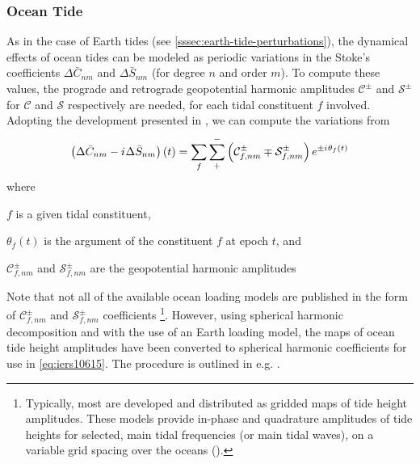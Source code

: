 \subsubsection{Ocean Tide}\label{sssec:ocean-tide-perturbations}

As in the case of Earth tides (see \autoref{sssec:earth-tide-perturbations}), the 
dynamical effects of ocean tides can be modeled as periodic variations in the 
Stoke's coefficients $\Delta \bar{C}_{nm}$ and $\Delta \bar{S}_{nm}$ (for 
degree $n$ and order $m$). To compute these values, the prograde and retrograde 
geopotential harmonic amplitudes $\mathcal{C}^{\pm}$ and $\mathcal{S}^{\pm}$ for 
$\mathcal{C}$ and $\mathcal{S}$ respectively are needed, for each tidal constituent 
$f$ involved. Adopting the development presented in \cite{iers2010}, we can compute 
the variations from
\begin{equation}
  \label{eq:iers10615}
  \left( \Delta \bar{C}_{nm} - {i\mkern1mu} \Delta \bar{S}_{nm} \right) (t) =
    \sum_{f} \sum_{+}^{-} \left( 
      \mathcal{C}_{f,nm}^{\pm} \mp \mathcal{S}_{f,nm}^{\pm} \right)
    e^{\pm {i\mkern1mu} \theta _f (t)}
\end{equation}
where
\begin{description}
  \item $f$ is a given tidal constituent,
  \item $\theta _f (t)$ is the argument of the constituent $f$ at epoch $t$, and
  \item $\mathcal{C}_{f,nm}^{\pm}$ and $\mathcal{S}_{f,nm}^{\pm}$ are the geopotential 
    harmonic amplitudes
\end{description}

Note that not all of the available ocean loading models are published in the form of 
$\mathcal{C}_{f,nm}^{\pm}$ and $\mathcal{S}_{f,nm}^{\pm}$ coefficients
\footnote{Typically, most are developed and distributed as gridded maps of tide 
height amplitudes. These models provide in-phase and quadrature amplitudes of tide 
heights for selected, main tidal frequencies (or main tidal waves), on a variable 
grid spacing over the oceans (\cite{iers2010}).}. However, using spherical harmonic 
decomposition and with the use of an Earth loading model, the maps of ocean tide 
height amplitudes have been converted to spherical harmonic coefficients for use 
in \autoref{eq:iers10615}. The procedure is outlined in e.g. \cite{iers2010}.

